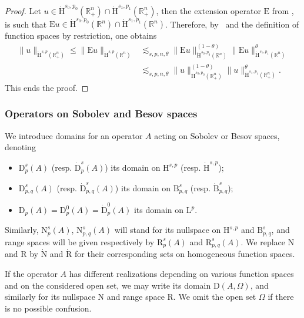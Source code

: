 \documentclass[AHL,Unicode,longabstracts,published]{cedram}
\newcommand{\bbR}{\mathbb{R}}
\newcommand{\rmH}{\mathrm{H}}%
\newcommand{\rmB}{\mathrm{B}}
\newcommand{\rmD}{\mathrm{D}}
\newcommand{\rmL}{\mathrm{L}}
\newcommand{\rmR}{\mathrm{R}}
\newcommand{\rmE}{\mathrm{E}}
\newcommand{\rmN}{\mathrm{N}}
\begin{document}
\begin{proof}
Let $u\in \dot{\rmH}^{s_0,p_0}(\bbR^n_+)\cap\dot{\rmH}^{s_1,p_1}(\bbR^n_+)$, then the extension operator $\rmE $ from \cite[Corollary~3.4]{Gaudin2022}, is such that $\rmE u\in \dot{\rmH}^{s_0,p_0}(\bbR^n)\cap\dot{\rmH}^{s_1,p_1}(\bbR^n)$. Therefore, by~\cite[Proposition~2.2~(vii),~Corollary~3.4]{Gaudin2022} and the definition of function spaces by restriction, one obtains
\begin{align*}
\| u \|_{\dot{\rmH}^{s,p}\left(\bbR^n_+\right)} \leqslant \| \rmE u \|_{\dot{\rmH}^{s,p}(\bbR^n)}&\lesssim_{s,p,n,\theta} \| \rmE u \|_{\dot{\rmH}^{s_0,p_0}(\bbR^n)}^{(1-\theta)}\| \rmE u\|_{\dot{\rmH}^{s_1,p_1}(\bbR^n)}^{\theta}\\ &\lesssim_{s,p,n,\theta} \| u \|_{\dot{\rmH}^{s_0,p_0}\left(\bbR^n_+\right)}^{(1-\theta)}\| u \|_{\dot{\rmH}^{s_1,p_1}\left(\bbR^n_+\right)}^{\theta}.
\end{align*}
This ends the proof.
\end{proof}

\subsubsection{Operators on Sobolev and Besov spaces}

We introduce domains for an operator $A$ acting on Sobolev or Besov spaces, denoting
\begin{itemize}
\item $\rmD^{s}_{p}(A)$ (resp. $\dot{\rmD}^{s}_{p}(A)$) its domain on $\rmH^{s,p}$ (resp. $\dot{\rmH}^{s,p}$);
\item $\rmD^{s}_{p,q}(A)$ (resp. $\dot{\rmD}^{s}_{p,q}(A)$) its domain on $\rmB^{s}_{p,q}$ (resp. $\dot{\rmB}^{s}_{p,q}$);
\item $\rmD_{p}(A) = \rmD^{0}_{p}(A) = \dot{\rmD}^{0}_{p}(A)$ its domain on $\rmL^p$.
\end{itemize}

Similarly, $\rmN^{s}_{p}(A)$, $\rmN^{s}_{p,q}(A)$ will stand for its nullspace on $\rmH^{s,p}$ and $\rmB^{s}_{p,q}$, and range spaces will be given respectively by $\rmR^{s}_{p}(A)$ and $\rmR^{s}_{p,q}(A)$. We replace $\rmN$ and $\rmR $ by $\dot{\rmN}$ and $\dot{\rmR}$ for their corresponding sets on homogeneous function spaces.

If the operator $A$ has different realizations depending on various function spaces and on the considered open set, we may write its domain $\rmD(A,\Omega)$, and similarly for its nullspace $\rmN$ and range space $\rmR$. We omit the open set $\Omega$ if there is no possible confusion.
\end{document}
